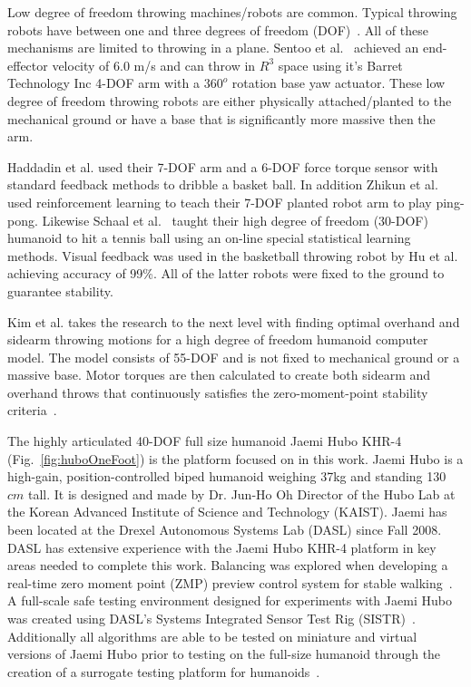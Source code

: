 Low degree of freedom throwing machines/robots are common.  Typical throwing robots have between one and three degrees of freedom (DOF)~\cite{509405, Lynch97dynamicnonprehensile, 5152525, 509335, springerlink:10.1007/s10015-006-0401-0}.  All of these mechanisms are limited to throwing in a plane.   Sentoo et al.~\cite{4651142} achieved an end-effector velocity of 6.0 m/s and can throw in $R^3$ space using it's Barret Technology Inc 4-DOF arm with a $360^o$ rotation base yaw actuator.  These low degree of freedom throwing robots are either physically attached/planted to the mechanical ground or have a base that is significantly more massive then the arm.  

Haddadin et al.\cite{6094757} used their 7-DOF arm and a 6-DOF force torque sensor with standard feedback methods to dribble a basket ball.  In addition Zhikun et al.~\cite{6094892} used reinforcement learning to teach their 7-DOF planted robot arm to play ping-pong.  Likewise Schaal et al.~\cite{schaal01/BIRG} taught their high degree of freedom (30-DOF) humanoid to hit a tennis ball using an on-line special statistical learning methods.  Visual feedback was used in the basketball throwing robot by Hu et al.~\cite{5649335} achieving accuracy of 99\%.  All of the latter robots were fixed to the ground to guarantee stability.

Kim et al. \cite{5686315,JooH2011438} takes the research to the next level with finding optimal overhand and sidearm throwing motions for a high degree of freedom humanoid computer model.  The model consists of 55-DOF and is not fixed to mechanical ground or a massive base.  Motor torques are then calculated to create both sidearm and overhand throws that continuously satisfies the zero-moment-point stability criteria~\cite{4309277}.  

The highly articulated 40-DOF full size humanoid Jaemi Hubo KHR-4 (Fig.~\ref{fig:huboOneFoot}) is the platform focused on in this work.  Jaemi Hubo is a high-gain, position-controlled biped humanoid weighing 37kg and standing 130 $cm$ tall.  It is designed and made by Dr. Jun-Ho Oh Director of the Hubo Lab at the Korean Advanced Institute of Science and Technology (KAIST).  Jaemi has been located at the Drexel Autonomous Systems Lab (DASL) since Fall 2008.  DASL has extensive experience with the Jaemi Hubo KHR-4 platform in key areas needed to complete this work.  Balancing was explored when developing a real-time zero moment point (ZMP) preview control system for stable walking~\cite{5686276}.  A full-scale safe testing environment designed for experiments with Jaemi Hubo was created using DASL's Systems Integrated Sensor Test Rig (SISTR)~\cite{5686325}.  Additionally all algorithms are able to be tested on miniature and virtual versions of Jaemi Hubo prior to testing on the full-size humanoid through the creation of a surrogate testing platform for humanoids~\cite{5379582}.


